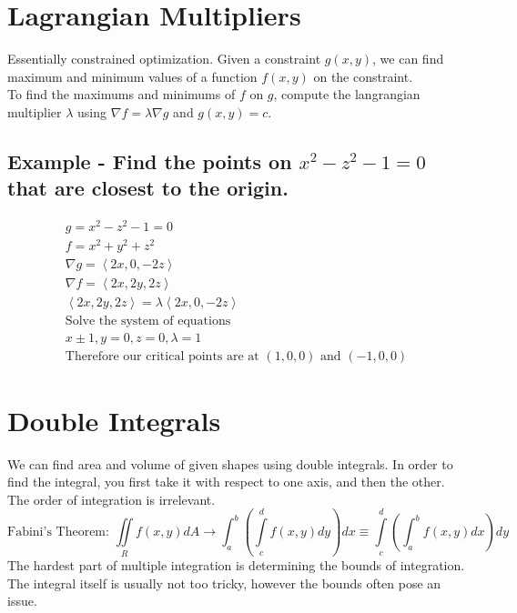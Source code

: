 \documentclass{article}
\newcommand{\nvec}[1]{\left\langle #1 \right\rangle}
\begin{document}
\section{Lagrangian Multipliers}
Essentially constrained optimization. Given a constraint $g(x, y)$, we can find maximum and minimum values of a function $f(x,y)$ on the constraint.\\

To find the maximums and minimums of $f$ on $g$, compute the langrangian multiplier $\lambda$ using $\nabla f = \lambda \nabla g$ and $g(x,y)=c$.

    \subsection{Example - Find the points on $x^2 - z^2 - 1 = 0$ that are closest to the origin.}
    \begin{equation}
    \begin{aligned}
    g = x^2 - z^2 - 1 = 0\\
    f = x^2 + y^2 + z^2\\
    \nabla g = \nvec{2x, 0, -2z}\\
    \nabla f = \nvec{2x, 2y, 2z}\\
    \nvec{2x, 2y, 2z} = \lambda \nvec{2x, 0, -2z}\\
    \text{Solve the system of equations}\\
    x \pm 1, y = 0, z = 0, \lambda = 1\\
    \text{Therefore our critical points are at } (1,0,0) \text{ and } (-1,0,0)
    \end{aligned}
    \end{equation}
\section{Double Integrals}
We can find area and volume of given shapes using double integrals. In order to find the integral, you first take it with respect to one axis, and then the other. The order of integration is irrelevant.\\
\begin{equation}
\text{Fabini's Theorem: } \iint\limits_R f(x,y)dA \to \int_a^b \left( \int\limits_c^d f(x,y)dy\right) dx \equiv \int\limits_c^d \left( \int_a^b f(x,y)dx\right) dy
\end{equation}
The hardest part of multiple integration is determining the bounds of integration. The integral itself is usually not too tricky, however the bounds often pose an issue.
\end{document}
